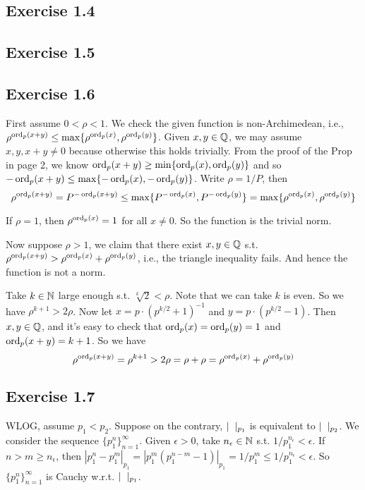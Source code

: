 \documentclass[../Koblitz.tex]{subfiles}
\begin{document}
\subsection*{Exercise 1.4}

\subsection*{Exercise 1.5}

\subsection*{Exercise 1.6}

First assume $0<\rho<1$. We check the given function is non-Archimedean, i.e., $\rho^{\operatorname{ord}_p(x+y)}\leq \max\{\rho^{\operatorname{ord}_p(x)},\rho^{\operatorname{ord}_p(y)}\}$. Given $x,y\in\mathbb{Q}$, we may assume $x,y,x+y\neq0$ because otherwise this holds trivially. From the proof of the Prop in page 2, we know $\operatorname{ord}_p(x+y) \geq \min\{\operatorname{ord}_p(x),\operatorname{ord}_p(y)\}$ and so $-\operatorname{ord}_p(x+y) \leq \max\{-\operatorname{ord}_p(x),-\operatorname{ord}_p(y)\}$. Write $\rho=1/P$, then $$\rho^{\operatorname{ord}_p(x+y)} = P^{-\operatorname{ord}_p(x+y)} \leq \max\{P^{-\operatorname{ord}_p(x)},P^{-\operatorname{ord}_p(y)}\} = \max\{\rho^{\operatorname{ord}_p(x)},\rho^{\operatorname{ord}_p(y)}\}$$

If $\rho=1$, then $\rho^{\operatorname{ord}_p(x)}=1$ for all $x\neq0$. So the function is the trivial norm.

Now suppose $\rho>1$, we claim that there exist $x,y\in\mathbb{Q}$ s.t. $\rho^{\operatorname{ord}_p(x+y)} > \rho^{\operatorname{ord}_p(x)}+\rho^{\operatorname{ord}_p(y)}$, i.e., the triangle inequality fails. And hence the function is not a norm.

Take $k\in\mathbb{N}$ large enough s.t. $\sqrt[k]{2}<\rho$. Note that we can take $k$ is even. So we have $\rho^{k+1}>2\rho$. Now let $x=p\cdot(p^{k/2}+1)^{-1}$ and $y=p\cdot(p^{k/2}-1)$. Then $x,y\in\mathbb{Q}$, and it's easy to check that $\operatorname{ord}_p(x)=\operatorname{ord}_p(y)=1$ and $\operatorname{ord}_p(x+y)=k+1$. So we have $$\rho^{\operatorname{ord}_p(x+y)} = \rho^{k+1} >2\rho = \rho+\rho = \rho^{\operatorname{ord}_p(x)}+\rho^{\operatorname{ord}_p(y)}$$

\subsection*{Exercise 1.7}

WLOG, assume $p_1<p_2$. Suppose on the contrary, $\snr_{p_1}$ is equivalent to $\snr_{p_2}$. We consider the sequence $\{p_1^n\}_{n=1}^\infty$. Given $\epsilon>0$, take $n_\epsilon\in\mathbb{N}$ s.t. $1/p_1^{n_\epsilon}<\epsilon$. If $n>m\geq n_\epsilon$, then $|p_1^n-p_1^m|_{p_1} = |p_1^m(p_1^{n-m}-1)|_{p_1} = 1/p_1^m \leq 1/p_1^{n_\epsilon} < \epsilon$. So $\{p_1^n\}_{n=1}^\infty$ is Cauchy w.r.t. $\snr_{p_1}$.
\end{document}
